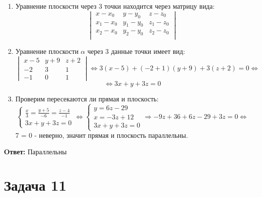 \documentclass{article}
\begin{document}
\begin{enumerate}
  \item Уравнение плоскости через 3 точки находится через матрицу вида:
    \[
      \begin{vmatrix}
        x-x_0 &y-y_0 &z-z_0\\ 
        x_1-x_0 &y_1-y_0 &z_1-z_0\\ 
        x_2-x_0 &y_2-y_0 &z_2-z_0\\ 
      \end{vmatrix}
    \]
  \item Уравнение плоскости $ \alpha $ через 3 данные точки имеет вид:
    \[
      \begin{vmatrix}
       x-5 &y+9 &z+2\\ 
       -2 &3 &1\\ 
       -1 &0 &1 
      \end{vmatrix}
    \Leftrightarrow 3(x-5) + (-2+1)(y+9) + 3(z+2) = 0 \Leftrightarrow\]\[
      \Leftrightarrow 3x+y+3z=0
    \]
  \item Проверим пересекаются ли прямая и плоскость:
    \[
      \begin{cases}
        \frac{x}{3} = \frac{y+5}{-6} = \frac{z-4}{-1}\\
        3x+y+3z=0
      \end{cases}
      \Leftrightarrow
      \begin{cases}
       y = 6z -29\\ 
       x = -3z+12\\ 
       3x + y + 3z = 0 
      \end{cases}
      \Rightarrow
      -9z + 36 +6z - 29 + 3z = 0 \Leftrightarrow
    \]
    7 = 0 - неверно, значит прямая и плоскость параллельны.
\end{enumerate}
\textbf{Oтвет: }Параллельны
\section*{Задача 11}
\end{document}
